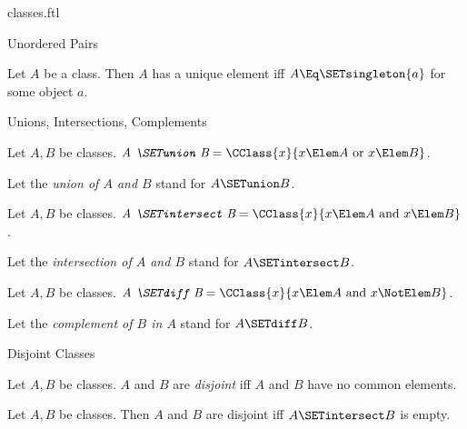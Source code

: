 \documentclass{stex}
\begin{document}
\begin{smodule}{classes.ftl}
\begin{sfragment}{Unordered Pairs}
  \begin{proposition}[forthel,id=FOUNDATIONS_01_0166348647163481]
    Let $A$ be a class.
    Then $A$ has a unique element iff $A \Eq \SETsingleton{a}$ for some object $a$.
  \end{proposition}
\end{sfragment}

\begin{sfragment}{Unions, Intersections, Complements}
  \begin{definition}[forthel,id=FOUNDATIONS_01_2159753924968448]
    Let $A, B$ be classes.
    $\emph{A \SETunion B} = \CClass{x}{x \Elem A\text{ or }x \Elem B}$.

    Let the \emph{union of $A$ and $B$} stand for $A \SETunion B$.
  \end{definition}

  \begin{definition}[forthel,id=FOUNDATIONS_01_5744033011859456]
    Let $A, B$ be classes.
    $\emph{A \SETintersect B} = \CClass{x}{x \Elem A\text{ and }x \Elem B}$.

    Let the \emph{intersection of $A$ and $B$} stand for $A \SETintersect B$.
  \end{definition}

  \begin{definition}[forthel,id=FOUNDATIONS_01_7620345041256448]
    Let $A, B$ be classes.
    $\emph{A \SETdiff B} = \CClass{x}{x \Elem A\text{ and }x \NotElem B}$.

    Let the \emph{complement of $B$ in $A$} stand for $A \SETdiff B$.
  \end{definition}
\end{sfragment}

\begin{sfragment}{Disjoint Classes}
  \begin{definition}[forthel,id=FOUNDATIONS_01_4981913324355584]
    Let $A, B$ be classes.
    $A$ and $B$ are \emph{disjoint} iff $A$ and $B$ have no common elements.
  \end{definition}

  \begin{proposition}[forthel,id=FOUNDATIONS_01_1211191546347520]
    Let $A, B$ be classes.
    Then $A$ and $B$ are disjoint iff $A \SETintersect B$ is empty.
  \end{proposition}
\end{sfragment}
\end{smodule}
\end{document}
